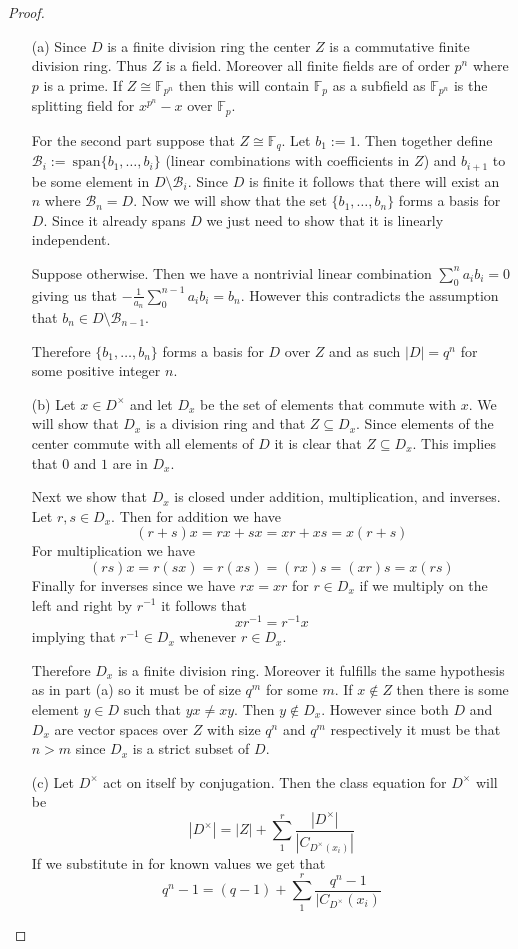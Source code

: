 \documentclass[10pt]{article}
\newcommand{\sk}{\vskip 10mm}
\newcommand{\bb}[1]{\mathbb{#1}}
\theoremstyle{remark}
\theoremstyle{remark}
\begin{document}
\begin{proof}
  \begin{enumerate}
  \item[(a)] Since $D$ is a finite division ring the center $Z$ is a
    commutative finite division ring. Thus $Z$ is a field. Moreover
    all finite fields are of order $p^n$ where $p$ is a prime. If
    $Z\cong\bb{F}_{p^n}$ then this will contain $\bb{F}_p$ as a subfield
    as $\bb{F}_{p^n}$ is the splitting field for $x^{p^n}-x$ over
    $\bb{F}_{p}$.

    \sk

    For the second part suppose that $Z\cong\bb{F}_q$. Let $b_1:= 1$. Then
    together define $\mathcal{B}_i:=~\mathrm{span}\{b_1,\ldots,b_i\}$
    (linear combinations with coefficients in $Z$) and
    $b_{i+1}$ to be some element in $D\setminus\mathcal{B}_i$. Since $D$ is finite
    it follows that there will exist an $n$ where $\mathcal{B}_n=D$. Now
    we will show that the set $\{b_1,\ldots,b_n\}$ forms a basis for $D$.
    Since it already spans $D$ we just need to show that it is linearly
    independent.

    Suppose otherwise. Then we have a nontrivial linear combination
    $\sum_0^na_ib_i=0$ giving us that $-\frac{1}{a_n}\sum_0^{n-1}a_ib_i=b_n$.
    However this contradicts the assumption that $b_n\in D\setminus\mathcal{B}_{n-1}$.

    Therefore $\{b_1,\ldots,b_n\}$ forms a basis for $D$ over $Z$ and as such
    $|D|=q^n$ for some positive integer $n$.
  \item[(b)] Let $x\in D^\times$ and let $D_x$ be the set of elements that commute
    with $x$. We will show that $D_x$ is a division ring and that $Z\subseteq D_x$.
    Since elements of the center commute with all elements of $D$ it is
    clear that $Z\subseteq D_x$. This implies that $0$ and $1$ are in $D_x$.

    Next we show that $D_x$ is closed under addition, multiplication, and inverses.
    Let $r,s\in D_x$. Then for addition we have
    \[
      (r+s)x=rx+sx=xr+xs=x(r+s)
    \]
    For multiplication we have
    \[
      (rs)x=r(sx)=r(xs)=(rx)s=(xr)s=x(rs)
    \]
    Finally for inverses since we have $rx=xr$ for $r\in D_x$ if we multiply
    on the left and right by $r^{-1}$ it follows that
    \[
      xr^{-1}=r^{-1}x
    \]
    implying that $r^{-1}\in D_x$ whenever $r\in D_x$.
    
    Therefore $D_x$ is a finite division ring. Moreover it fulfills the
    same hypothesis as in part (a) so it must be of size $q^m$ for some $m$.
    If $x\notin Z$ then there is some element $y\in D$ such that $yx\neq xy$. Then
    $y\notin D_x$. However since both $D$ and $D_x$ are vector spaces over $Z$
    with size $q^n$ and $q^m$ respectively it must be that $n>m$ since
    $D_x$ is a strict subset of $D$.
  \item[(c)] Let $D^\times$ act on itself by conjugation. Then the class equation
    for $D^\times$ will be
    \[
      |D^\times| = |Z|+\sum_1^r\frac{|D^\times|}{|C_{D^\times(x_i)}|}
    \]
    If we substitute in for known values we get that
    \[
      q^n-1 = (q-1)+\sum_1^r\frac{q^n-1}{|C_{D^\times}(x_i)}
    \]


\end{enumerate}
\end{proof}
\end{document}
